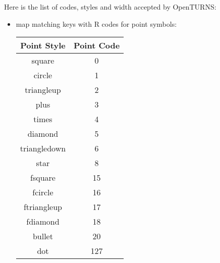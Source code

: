 Here is the list of codes, styles and width accepted by OpenTURNS:
\begin{itemize}
\item map  matching keys with R codes for point symbols:

  \begin{center}
    \begin{tabular}{c|c}
      Point Style & Point Code \\
      \hline
      square & 0 \\
      \hline
      circle & 1\\
      \hline
      triangleup & 2\\
      \hline
      plus & 3\\
      \hline
      times & 4 \\
      \hline
      diamond & 5\\
      \hline
      triangledown & 6\\
      \hline
      star & 8\\
      \hline
      fsquare & 15\\
      \hline
      fcircle & 16\\
      \hline
      ftriangleup & 17\\
      \hline
      fdiamond  & 18\\
      \hline
      bullet & 20 \\
      \hline
      dot & 127
    \end{tabular}
  \end{center}


\end{itemize}
